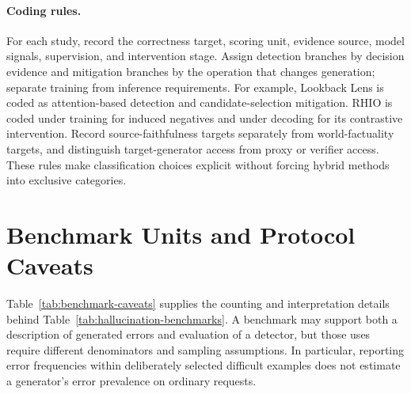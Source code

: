 \paragraph{Coding rules.}
For each study, record the correctness target, scoring unit, evidence source, model signals, supervision, and intervention stage. Assign detection branches by decision evidence and mitigation branches by the operation that changes generation; separate training from inference requirements. For example, Lookback Lens is coded as attention-based detection and candidate-selection mitigation. RHIO is coded under training for induced negatives and under decoding for its contrastive intervention. Record source-faithfulness targets separately from world-factuality targets, and distinguish target-generator access from proxy or verifier access. These rules make classification choices explicit without forcing hybrid methods into exclusive categories.

\section{Benchmark Units and Protocol Caveats}\label{app:benchmarks}
Table~\ref{tab:benchmark-caveats} supplies the counting and interpretation details behind Table~\ref{tab:hallucination-benchmarks}. A benchmark may support both a description of generated errors and evaluation of a detector, but those uses require different denominators and sampling assumptions. In particular, reporting error frequencies within deliberately selected difficult examples does not estimate a generator's error prevalence on ordinary requests.

